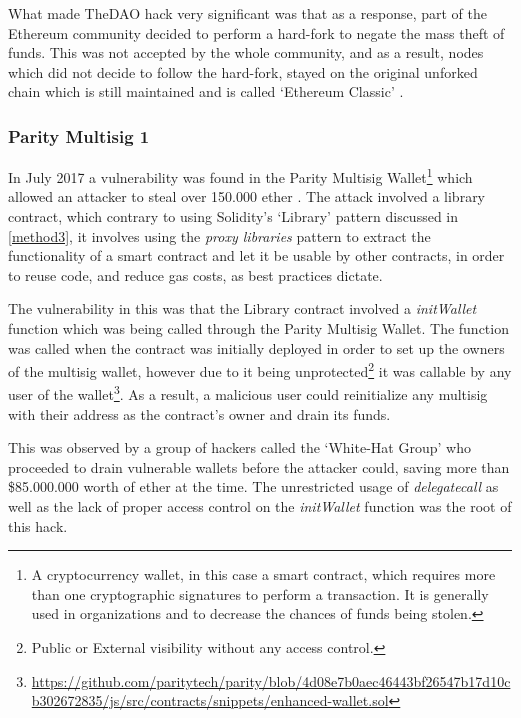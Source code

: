 What made TheDAO hack very significant was that as a response, part of the Ethereum community decided to perform a hard-fork to negate the mass theft of funds. This was not accepted by the whole community, and as a result, nodes which did not decide to follow the hard-fork, stayed on the original unforked chain which is still maintained and is called `Ethereum Classic' \cite{etc}. 

\subsubsection{Parity Multisig 1}
In July 2017 a vulnerability was found in the Parity Multisig Wallet\footnote{A cryptocurrency wallet, in this case a smart contract, which requires more than one cryptographic signatures to perform a transaction. It is generally used in organizations and to decrease the chances of funds being stolen.} which allowed an attacker to steal over 150.000 ether \cite{parityhack}. The attack involved a library contract, which contrary to using Solidity's `Library' pattern discussed in \ref{method3}, it involves using the \textit{proxy libraries} pattern \cite{proxylibraries} to extract the functionality of a smart contract and let it be usable by other contracts, in order to reuse code, and reduce gas costs, as best practices dictate.

The vulnerability in this was that the Library contract involved a \textit{initWallet} function which was being called through the Parity Multisig Wallet. The function was called when the contract was initially deployed in order to set up the owners of the multisig wallet, however due to it being unprotected\footnote{Public or External visibility without any access control.} it was callable by any user of the wallet\footnote{\url{https://github.com/paritytech/parity/blob/4d08e7b0aec46443bf26547b17d10cb302672835/js/src/contracts/snippets/enhanced-wallet.sol}}. As a result, a malicious user could reinitialize any multisig with their address as the contract's owner and drain its funds.

This was observed by a group of hackers called the `White-Hat Group' who proceeded to drain vulnerable wallets before the attacker could, saving more than \$85.000.000 worth of ether at the time. The unrestricted usage of \textit{delegatecall} as well as the lack of proper access control on the \textit{initWallet} function was the root of this hack. 

